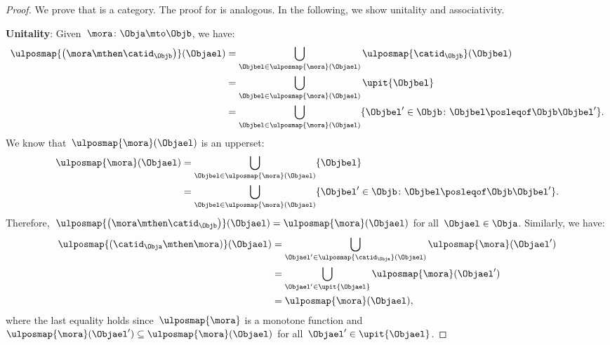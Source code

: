 \begin{proof}
    We prove that \UPos is a category.
    The proof for \LPos is analogous.
    In the following, we show unitality and associativity.

    \textbf{Unitality}:
    Given~$\mora\colon \Obja \mto \Objb$, we have:
    \begin{equation*}
        \begin{aligned}
            \ulposmap{\left( \mora \mthen \catid_\Objb\right)}(\Objael) & =\bigcup_{\Objbel\in \ulposmap{\mora}(\Objael)}\ulposmap{\catid_\Objb}(\Objbel)                              \\
                                                                        & =\bigcup_{\Objbel\in \ulposmap{\mora}(\Objael)}\upit\{\Objbel\}                                              \\
                                                                        & =\bigcup_{\Objbel\in \ulposmap{\mora}(\Objael)}\{\Objbel'\in \Objb \colon \Objbel\posleqof\Objb \Objbel' \}.
        \end{aligned}
    \end{equation*}
    We know that~$\ulposmap{\mora}(\Objael)$ is an upperset:
    \begin{equation*}
        \begin{aligned}
            \ulposmap{\mora}(\Objael) & =\bigcup_{\Objbel\in \ulposmap{\mora}(\Objael)}\{\Objbel\}                                                   \\
                                      & =\bigcup_{\Objbel\in \ulposmap{\mora}(\Objael)}\{ \Objbel'\in \Objb \colon \Objbel\posleqof\Objb \Objbel'\}.
        \end{aligned}
    \end{equation*}
    Therefore,~$\ulposmap{\left( \mora \mthen \catid_\Objb\right)}(\Objael)=\ulposmap{\mora}(\Objael)$ for all~$\Objael\in \Obja$.
    Similarly, we have:
    \begin{equation*}
        \begin{aligned}
            \ulposmap{(\catid_\Obja \mthen \mora)}(\Objael) & =\bigcup_{\Objael'\in \ulposmap{\catid_\Obja}(\Objael)}\ulposmap{\mora}(\Objael') \\
                                                            & =\bigcup_{\Objael'\in \upit \{\Objael\}}\ulposmap{\mora}(\Objael')                \\
                                                            & =\ulposmap{\mora}(\Objael),
        \end{aligned}
    \end{equation*}
    where the last equality holds since~$\ulposmap{\mora}$ is a monotone function and~$\ulposmap{\mora}(\Objael')\subseteq \ulposmap{\mora}(\Objael)$ for all~$\Objael'\in \upit \{\Objael\}$.


\end{proof}
